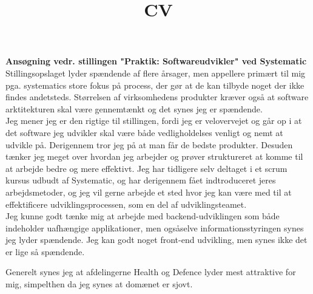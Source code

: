 \documentclass[11pt,a4paper,sans]{moderncv} %
\title{CV}
\begin{document}


%
%
%
%
%

\textbf{Ans\o gning  vedr. stillingen "Praktik: Softwareudvikler" ved Systematic}
\vspace{2mm} 
\\
 Stillingsopslaget lyder sp\ae ndende af flere \aa rsager, men appellere prim\ae rt til mig pga. systematics store fokus p{\aa} process, der g\o r at de kan tilbyde noget der ikke findes andetsteds. St\o rrelsen af virksomhedens produkter kr\ae ver ogs{\aa} at software arktitekturen skal v\ae re gennemt\ae nkt og det synes jeg er sp\ae ndende. \\

Jeg mener jeg er den rigtige til stillingen, fordi jeg er velovervejet og g\aa r op i at det software jeg udvikler skal v\ae re b\aa de vedligholdelses venligt og nemt at udvikle p\aa. Derigennem tror jeg p{\aa} at man f\aa r de bedste produkter. 
Desuden t\ae nker jeg meget over hvordan jeg arbejder og pr\o ver struktureret at komme til at arbejde bedre og mere effektivt. Jeg har tidligere selv deltaget i et scrum kursus udbudt af Systematic, og har derigennem f\aa et indtroduceret jeres arbejdsmetoder, og jeg vil gerne arbejde et sted hvor jeg kan v\ae re med til at effektificere udviklingsprocessen, som en del af udviklingsteamet.\\



Jeg kunne godt t\ae nke mig at arbejde med backend-udviklingen som b\aa de indeholder uafh\ae ngige applikationer, men ogs\aa selve informationsstyringen synes jeg lyder sp\ae ndende. Jeg kan godt noget front-end udvikling, men synes ikke det er lige s{\aa} sp\ae ndende.

Generelt synes jeg at afdelingerne Health og Defence lyder mest attraktive for mig, simpelthen da jeg synes at dom\ae net er sjovt.\\
\end{document}
